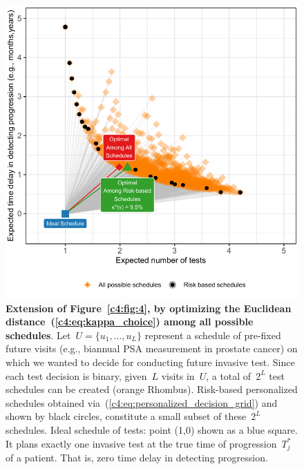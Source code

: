 \begin{subappendices}
\begin{figure}
\centerline{\includegraphics{contents/c4/images/c4_fig_app2.pdf}}
\caption{\textbf{Extension of Figure~\ref{c4:fig:4}, by optimizing the Euclidean distance~(\ref{c4:eq:kappa_choice}) among all possible schedules}. Let~$U = \{u_1, \ldots, u_L\}$ represent a schedule of pre-fixed future visits (e.g., biannual PSA measurement in prostate cancer) on which we wanted to decide for conducting future invasive test. Since each test decision is binary, given~$L$ visits in~$U$, a total of~$2^L$ test schedules can be created (orange Rhombus). Risk-based personalized schedules obtained via~(\ref{c4:eq:personalized_decision_grid}) and shown by black circles, constitute a small subset of these~$2^L$ schedules. Ideal schedule of tests: point (1,0) shown as a blue square. It plans exactly one invasive test at the true time of progression~$T^*_j$ of a patient. That is, zero time delay in detecting progression.}
\label{c4:fig:app2}
\end{figure}


\end{subappendices}
